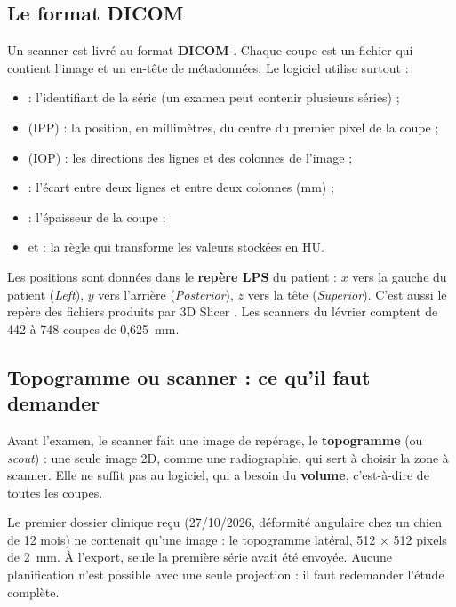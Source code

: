 \subsection{Le format DICOM}

Un scanner est livré au format \textbf{DICOM} \cite{dicom}. Chaque coupe est un fichier qui contient l'image et un
en-tête de métadonnées. Le logiciel utilise surtout :
\begin{itemize}
  \item {} : l'identifiant de la série (un examen peut contenir plusieurs séries) ;
  \item {} (IPP) : la position, en millimètres, du centre du premier pixel de la coupe ;
  \item {} (IOP) : les directions des lignes et des colonnes de l'image ;
  \item {} : l'écart entre deux lignes et entre deux colonnes (mm) ;
  \item {} : l'épaisseur de la coupe ;
  \item {} et  : la règle qui transforme les valeurs stockées en HU.
\end{itemize}

Les positions sont données dans le \textbf{repère LPS} du patient : $x$ vers la gauche du patient
(\emph{Left}), $y$ vers l'arrière (\emph{Posterior}), $z$ vers la tête (\emph{Superior}). C'est aussi le repère des
fichiers produits par 3D Slicer \cite{fedorov2012}. Les scanners du lévrier comptent de 442 à 748 coupes de 0,625~mm.

\subsection{Topogramme ou scanner : ce qu'il faut demander}
\label{sec:topogramme}

Avant l'examen, le scanner fait une image de repérage, le \textbf{topogramme} (ou \emph{scout}) : une seule image 2D,
comme une radiographie, qui sert à choisir la zone à scanner. Elle ne suffit pas au logiciel, qui a besoin du
\textbf{volume}, c'est-à-dire de toutes les coupes.

\begin{attention}[title={Un cas vécu}]
Le premier dossier clinique reçu (27/10/2026, déformité angulaire chez un chien de 12 mois) ne contenait qu'une
image : le topogramme latéral, 512 × 512 pixels de 2~mm. À l'export, seule la première série avait été envoyée.
Aucune planification n'est possible avec une seule projection : il faut redemander l'étude complète.
\end{attention}

